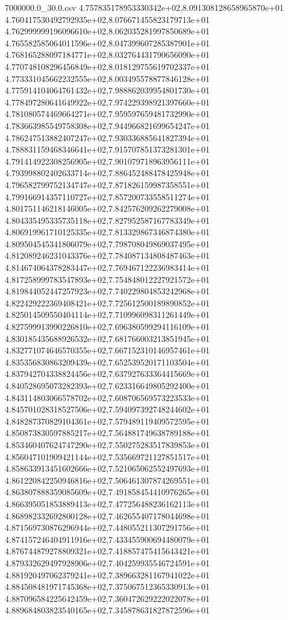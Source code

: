 \begin{filecontents*}{7000000.0_30.0.csv}
4.757835178953330342e+02,8.091308128658965870e+01
4.760417530492792935e+02,8.076671455823179713e+01
4.762999999196096610e+02,8.062035281997850689e+01
4.765582585064011596e+02,8.047399607285387901e+01
4.768165288097184771e+02,8.032764431790656090e+01
4.770748108296456849e+02,8.018129755619702337e+01
4.773331045662232555e+02,8.003495578877846128e+01
4.775914104064761432e+02,7.988862039954801730e+01
4.778497280641649922e+02,7.974229398921397660e+01
4.781080574469664271e+02,7.959597659481732990e+01
4.783663985549758308e+02,7.944966821699654247e+01
4.786247513882407247e+02,7.930336885641827394e+01
4.788831159468346641e+02,7.915707851373281301e+01
4.791414922308256905e+02,7.901079718963956111e+01
4.793998802402633714e+02,7.886452488478425948e+01
4.796582799752134747e+02,7.871826159987358551e+01
4.799166914357110727e+02,7.857200733558511274e+01
4.801751146218146005e+02,7.842576209262279008e+01
4.804335495335735118e+02,7.827952587167783349e+01
4.806919961710125335e+02,7.813329867346874380e+01
4.809504545341806079e+02,7.798708049869037495e+01
4.812089246231043376e+02,7.784087134808487463e+01
4.814674064378283447e+02,7.769467122236983414e+01
4.817258999783547893e+02,7.754848012227921572e+01
4.819844052447257923e+02,7.740229804853242968e+01
4.822429222369408421e+02,7.725612500189890852e+01
4.825014509550404114e+02,7.710996098311261449e+01
4.827599913990226810e+02,7.696380599294116109e+01
4.830185435688926532e+02,7.681766003213851945e+01
4.832771074646570355e+02,7.667152310146957461e+01
4.835356830863209439e+02,7.652539520171103504e+01
4.837942704338824456e+02,7.637927633364415669e+01
4.840528695073282393e+02,7.623316649805292400e+01
4.843114803066578702e+02,7.608706569573223533e+01
4.845701028318527506e+02,7.594097392748244602e+01
4.848287370829104361e+02,7.579489119409572595e+01
4.850873830597885217e+02,7.564881749638789188e+01
4.853460407624747290e+02,7.550275283517839853e+01
4.856047101909421144e+02,7.535669721127851517e+01
4.858633913451602666e+02,7.521065062552497693e+01
4.861220842250946816e+02,7.506461307874269551e+01
4.863807888359085609e+02,7.491858454410976265e+01
4.866395051853889413e+02,7.477256488236162113e+01
4.868982332692800128e+02,7.462655407178044698e+01
4.871569730876296944e+02,7.448055211307291756e+01
4.874157246404911916e+02,7.433455900694480079e+01
4.876744879278809321e+02,7.418857475415643421e+01
4.879332629497928906e+02,7.404259935546724591e+01
4.881920497062379241e+02,7.389663281167941022e+01
4.884508481971745368e+02,7.375067512365330913e+01
4.887096584225642459e+02,7.360472629222022078e+01
4.889684803823540165e+02,7.345878631827872596e+01

\end{filecontents*}

